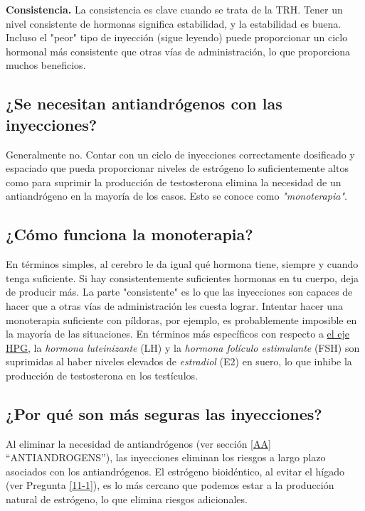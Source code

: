 \documentclass{article}
\begin{document}
\textbf{Consistencia.} La consistencia es clave cuando se trata de la TRH. Tener un nivel consistente de hormonas significa estabilidad, y la estabilidad es buena. Incluso el "peor" tipo de inyección (sigue leyendo) puede proporcionar un ciclo hormonal más consistente que otras vías de administración, lo que proporciona muchos beneficios.

\subsection{¿Se necesitan antiandrógenos con las inyecciones?}

Generalmente no. Contar con un ciclo de inyecciones correctamente dosificado y espaciado que pueda proporcionar niveles de estrógeno lo suficientemente altos como para suprimir la producción de testosterona elimina la necesidad de un antiandrógeno en la mayoría de los casos. Esto se conoce como \textit{"monoterapia"}.

\subsection{¿Cómo funciona la monoterapia?}\label{2-3}

En términos simples, al cerebro le da igual qué hormona tiene, siempre y cuando tenga suficiente. Si hay consistentemente suficientes hormonas en tu cuerpo, deja de producir más. La parte "consistente" es lo que las inyecciones son capaces de hacer que a otras vías de administración les cuesta lograr. Intentar hacer una monoterapia suficiente con píldoras, por ejemplo, es probablemente imposible en la mayoría de las situaciones. En términos más específicos con respecto a \href{https://en.wikipedia.org/wiki/Hypothalamic-pituitary-gonadal_axis}{el eje HPG}, la \textit{hormona luteinizante} (LH) y la \textit{hormona folículo estimulante} (FSH) son suprimidas al haber niveles elevados de \textit{estradiol} (E2) en suero, lo que inhibe la producción de testosterona en los testículos.

\subsection{¿Por qué son más seguras las inyecciones?}

Al eliminar la necesidad de antiandrógenos (ver sección \ref{AA} “ANTIANDROGENS”), las inyecciones eliminan los riesgos a largo plazo asociados con los antiandrógenos. El estrógeno bioidéntico, al evitar el hígado (ver Pregunta \ref{11-1}), es lo más cercano que podemos estar a la producción natural de estrógeno, lo que elimina riesgos adicionales.
\end{document}
